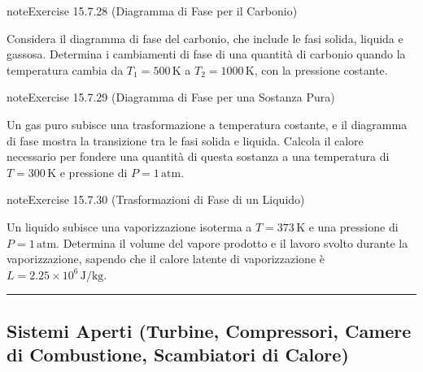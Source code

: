 \documentclass[letterpaper,10pt,italian]{jupyterBook}
\begin{document}
\begin{sphinxadmonition}{note}{Exercise 15.7.28 (Diagramma di Fase per il Carbonio)}



\sphinxAtStartPar
Considera il diagramma di fase del carbonio, che include le fasi solida, liquida e gassosa. Determina i cambiamenti di fase di una quantità di carbonio quando la temperatura cambia da \(T_1 = 500 \, \text{K}\) a \(T_2 = 1000 \, \text{K}\), con la pressione costante.
\end{sphinxadmonition}
 \label{exercise:ch/thermodynamics/principles-problems-exercise-28}

\begin{sphinxadmonition}{note}{Exercise 15.7.29 (Diagramma di Fase per una Sostanza Pura)}



\sphinxAtStartPar
Un gas puro subisce una trasformazione a temperatura costante, e il diagramma di fase mostra la transizione tra le fasi solida e liquida. Calcola il calore necessario per fondere una quantità di questa sostanza a una temperatura di \(T = 300 \, \text{K}\) e pressione di \(P = 1 \, \text{atm}\).
\end{sphinxadmonition}
 \label{exercise:ch/thermodynamics/principles-problems-exercise-29}

\begin{sphinxadmonition}{note}{Exercise 15.7.30 (Trasformazioni di Fase di un Liquido)}



\sphinxAtStartPar
Un liquido subisce una vaporizzazione isoterma a \(T = 373 \, \text{K}\) e una pressione di \(P = 1 \, \text{atm}\). Determina il volume del vapore prodotto e il lavoro svolto durante la vaporizzazione, sapendo che il calore latente di vaporizzazione è \(L = 2.25 \times 10^6 \, \text{J/kg}\).
\end{sphinxadmonition}


\bigskip\hrule\bigskip



\subsection{Sistemi Aperti (Turbine, Compressori, Camere di Combustione, Scambiatori di Calore)}
\label{\detokenize{ch/thermodynamics/principles-problems:sistemi-aperti-turbine-compressori-camere-di-combustione-scambiatori-di-calore}} \label{exercise:ch/thermodynamics/principles-problems-exercise-30}
\end{document}
